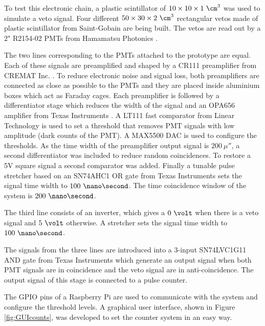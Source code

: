 \begin{enumerate}
To test this electronic chain, a plastic scintillator of $10 \times 10 \times 1~\cm^3$ was used to simulate a veto signal. Four different $50\times 30 \times 2~\cm^3$  rectangular vetos made of plastic scintillator from Saint-Gobain \cite{VetoAveiro} are being built. The vetos are read out by a $2$" R2154-02 PMTs from Hamamatsu Photonics \cite{DataSheetPMTsAveiro}. %

The two lines corresponding to the PMTs attached to the prototype are equal. Each of these signals are preamplified and shaped by a CR111 preamplifier from CREMAT Inc. \cite{CREMATPreAmplifierDataSheet}. To reduce electronic noise and signal loss, both preamplifiers are connected as close as possible to the PMTs and they are placed inside aluminium boxes which act as Faraday cages. Each preamplifier is followed by a differentiator stage which reduces the width of the signal and an OPA656 amplifier from Texas Instruments \cite{OPA656}. A LT111 fast comparator from Linear Technology \cite{LT111} is used to set a threshold that removes PMT signals with low amplitude (dark counts of the PMT). A MAX5500 DAC is used to configure the thresholds. As the time width of the preamplifier output signal is $200~\mu\second$, a second differentiator was included to reduce random coincidences. To restore a 5V square signal a second comparator was added. Finally a tunable pulse stretcher based on an SN74AHC1 OR gate from Texas Instruments \cite{Stretcher} sets the signal time width to $100~\nano\second$. The time coincidence window of the system is $200~\nano\second$.

The third line consists of an inverter, which gives a $0~\volt$ when there is a veto signal and $5~\volt$ otherwise. A stretcher sets the signal time width to $100~\nano\second$.

The signals from the three lines are introduced into a 3-input SN74LVC1G11 AND gate from Texas Instruments \cite{ANDGate} which generate an output signal when both PMT signals are in coincidence and the veto signal are in anti-coincidence. The output signal of this stage is connected to a pulse counter. 

The GPIO pins of a Raspberry Pi are used to communicate with the system and configure the threshold levels. A graphical user interface, shown in Figure \ref{fig:GUIcounts}, was developed to set the counter system in an easy way.


\end{enumerate}
